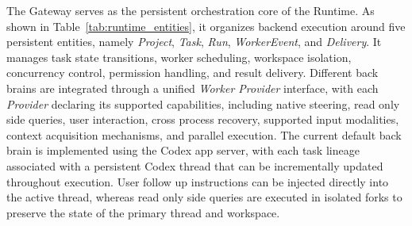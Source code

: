 

The Gateway serves as the persistent orchestration core of the Runtime. As shown in Table~\ref{tab:runtime_entities}, it organizes backend execution around five persistent entities, namely \textit{Project}, \textit{Task}, \textit{Run}, \textit{WorkerEvent}, and \textit{Delivery}. It manages task state transitions, worker scheduling, workspace isolation, concurrency control, permission handling, and result delivery. Different back brains are integrated through a unified \textit{Worker Provider} interface, with each \textit{Provider} declaring its supported capabilities, including native steering, read only side queries, user interaction, cross process recovery, supported input modalities, context acquisition mechanisms, and parallel execution. The current default back brain is implemented using the Codex app server, with each task lineage associated with a persistent Codex thread that can be incrementally updated throughout execution. User follow up instructions can be injected directly into the active thread, whereas read only side queries are executed in isolated forks to preserve the state of the primary thread and workspace.




